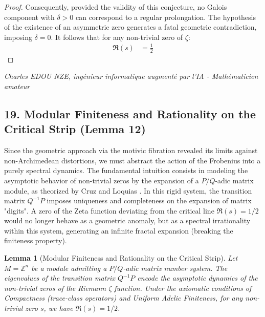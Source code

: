 \documentclass[
]{article}
\newtheorem{lemma}{Lemma}
\begin{document}
\begin{proof}
Consequently, provided the validity of this conjecture, no Galois component with $\delta > 0$ can correspond to a regular prolongation. The hypothesis of the existence of an asymmetric zero generates a fatal geometric contradiction, imposing $\delta = 0$. It follows that for any non-trivial zero of $\zeta$:
\begin{align*}
    \Re(s) &= \frac{1}{2}
\end{align*}
\end{proof}

\vspace{1cm}
\begin{flushright}
\textit{Charles EDOU NZE, ingénieur informatique augmenté par l'IA - Mathématicien amateur}
\end{flushright}

\subsection{19. Modular Finiteness and Rationality on the Critical Strip (Lemma 12)}

Since the geometric approach via the motivic fibration revealed its limits against non-Archimedean distortions, we must abstract the action of the Frobenius into a purely spectral dynamics. The fundamental intuition consists in modeling the asymptotic behavior of non-trivial zeros by the expansion of a $P/Q$-adic matrix module, as theorized by Cruz and Loquias \cite{cruz2026}. In this rigid system, the transition matrix $Q^{-1}P$ imposes uniqueness and completeness on the expansion of matrix "digits". A zero of the Zeta function deviating from the critical line $\Re(s) = 1/2$ would no longer behave as a geometric anomaly, but as a spectral irrationality within this system, generating an infinite fractal expansion (breaking the finiteness property).

\begin{lemma}[Modular Finiteness and Rationality on the Critical Strip]
    Let $M = \mathbb{Z}^n$ be a module admitting a $P/Q$-adic matrix number system. The eigenvalues of the transition matrix $Q^{-1}P$ encode the asymptotic dynamics of the non-trivial zeros of the Riemann $\zeta$ function. Under the axiomatic conditions of Compactness (trace-class operators) and Uniform Adelic Finiteness, for any non-trivial zero $s$, we have $\Re(s) = 1/2$.
\end{lemma}
\end{document}

